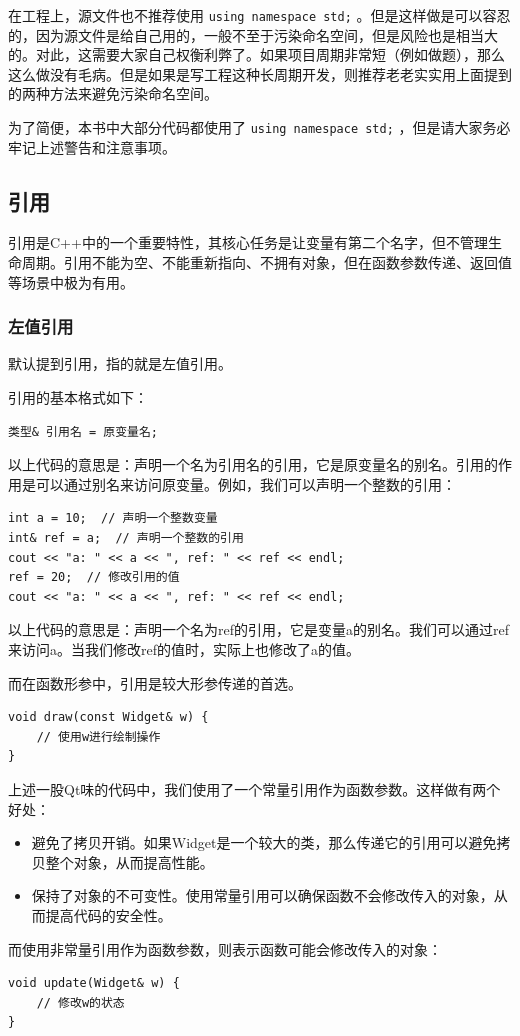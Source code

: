 \begin{caution}
  在工程上，源文件也不推荐使用 \texttt{using namespace std;} 。但是这样做是可以容忍的，因为源文件是给自己用的，一般不至于污染命名空间，但是风险也是相当大的。对此，这需要大家自己权衡利弊了。如果项目周期非常短（例如做题），那么这么做没有毛病。但是如果是写工程这种长周期开发，则推荐老老实实用上面提到的两种方法来避免污染命名空间。
\end{caution}

\begin{note}
  为了简便，本书中大部分代码都使用了 \texttt{using namespace std;} ，但是请大家务必牢记上述警告和注意事项。
\end{note}

\subsection{引用}

引用是C++中的一个重要特性，其核心任务是让变量有第二个名字，但不管理生命周期。引用不能为空、不能重新指向、不拥有对象，但在函数参数传递、返回值等场景中极为有用。

\subsubsection{左值引用}

默认提到引用，指的就是左值引用。

引用的基本格式如下：
\begin{verbatim}
类型& 引用名 = 原变量名;
\end{verbatim}
以上代码的意思是：声明一个名为引用名的引用，它是原变量名的别名。引用的作用是可以通过别名来访问原变量。例如，我们可以声明一个整数的引用：
\begin{verbatim}
int a = 10;  // 声明一个整数变量
int& ref = a;  // 声明一个整数的引用
cout << "a: " << a << ", ref: " << ref << endl;
ref = 20;  // 修改引用的值
cout << "a: " << a << ", ref: " << ref << endl;
\end{verbatim}

以上代码的意思是：声明一个名为ref的引用，它是变量a的别名。我们可以通过ref来访问a。当我们修改ref的值时，实际上也修改了a的值。

而在函数形参中，引用是较大形参传递的首选。
\begin{verbatim}
void draw(const Widget& w) {
    // 使用w进行绘制操作
}
\end{verbatim}
上述一股Qt味的代码中，我们使用了一个常量引用作为函数参数。这样做有两个好处：
\begin{itemize}
  \item 避免了拷贝开销。如果Widget是一个较大的类，那么传递它的引用可以避免拷贝整个对象，从而提高性能。
  \item 保持了对象的不可变性。使用常量引用可以确保函数不会修改传入的对象，从而提高代码的安全性。
\end{itemize}
而使用非常量引用作为函数参数，则表示函数可能会修改传入的对象：
\begin{verbatim}
void update(Widget& w) {
    // 修改w的状态
}
\end{verbatim}

